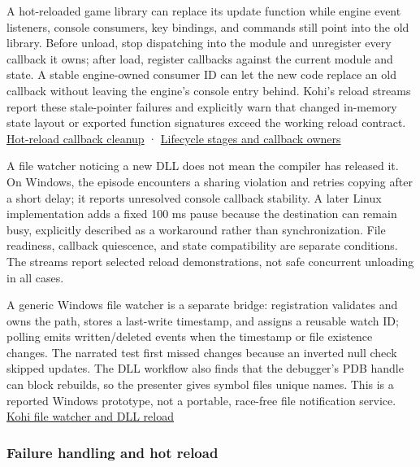 \hypertarget{06-engine-ii-ch027-quiesce-every-callback-before-unloading-a-code-module}{}

A hot-reloaded game library can replace its update function while engine event listeners, console consumers, key bindings, and commands still point into the old library. Before unload, stop dispatching into the module and unregister every callback it owns; after load, register callbacks against the current module and state. A stable engine-owned consumer ID can let the new code replace an old callback without leaving the engine's console entry behind. Kohi's reload streams report these stale-pointer failures and explicitly warn that changed in-memory state layout or exported function signatures exceed the working reload contract. \href{https://www.youtube.com/watch?v=U1C9mMrpyF4}{Hot-reload callback cleanup} · \href{https://www.youtube.com/watch?v=W-y6qSUOTw0}{Lifecycle stages and callback owners}

A file watcher noticing a new DLL does not mean the compiler has released it. On Windows, the episode encounters a sharing violation and retries copying after a short delay; it reports unresolved console callback stability. A later Linux implementation adds a fixed 100 ms pause because the destination can remain busy, explicitly described as a workaround rather than synchronization. File readiness, callback quiescence, and state compatibility are separate conditions. The streams report selected reload demonstrations, not safe concurrent unloading in all cases.

A generic Windows file watcher is a separate bridge: registration validates and owns the path, stores a last-write timestamp, and assigns a reusable watch ID; polling emits written/deleted events when the timestamp or file existence changes. The narrated test first missed changes because an inverted null check skipped updates. The DLL workflow also finds that the debugger's PDB handle can block rebuilds, so the presenter gives symbol files unique names. This is a reported Windows prototype, not a portable, race-free file notification service. \href{https://www.youtube.com/watch?v=SBG-qrT8wmg}{Kohi file watcher and DLL reload}

\subsubsection{Failure handling and hot reload}\label{06-engine-ii-ch027-failure-handling-and-hot-reload}

\hypertarget{06-engine-ii-ch027-failure-handling-and-hot-reload}{}

